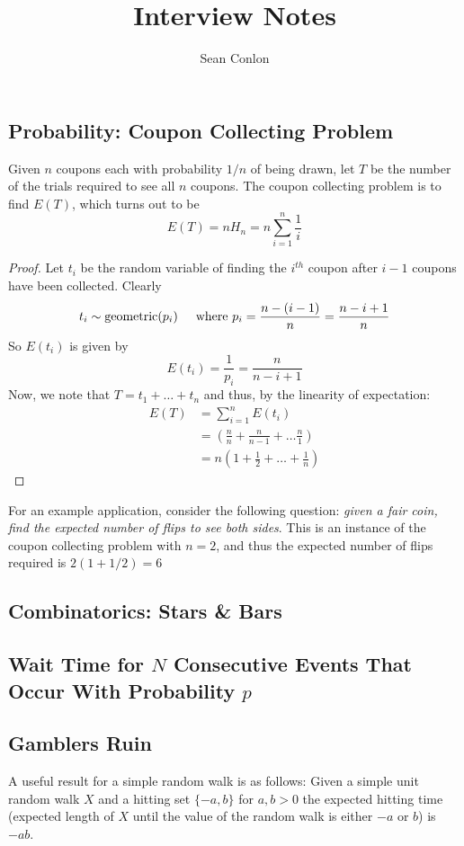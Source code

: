 \documentclass{article}
\title{Interview Notes}
\author{Sean Conlon}
\begin{document}
\maketitle

\newpage
\subsection*{Probability: Coupon Collecting Problem}
Given $n$ coupons each with probability $1/n$ of being drawn, let $T$ be the number of the trials required to see all $n$ coupons. The coupon collecting problem is to find $E(T)$, which turns out to be 
$$E(T) = n H_n = n \sum_{i=1}^{n}\frac{1}{i}$$
\begin{proof}
    Let $t_i$ be the random variable of finding the $i^{th}$ coupon after $i-1$ coupons have been collected. Clearly
    $$t_i \sim \text{geometric}(p_i) \hspace{5mm} \text{where } p_i = \frac{n-(i-1)}{n} = \frac{n-i+1}{n}$$
    So $E(t_i)$ is given by 
    $$E(t_i) = \frac{1}{p_i} = \frac{n}{n-i+1}$$
    Now, we note that $T = t_1 + \dots + t_n$ and thus, by the linearity of expectation: 
    \begin{align*}
        E(T) &= \sum_{i=1}^{n}E(t_i) \\
        &= \left(\frac{n}{n} + \frac{n}{n-1} + \dots \frac{n}{1} \right) \\
        &= n\left(1 + \frac{1}{2} + \dots + \frac{1}{n} \right)
    \end{align*}
\end{proof}
For an example application, consider the following question: \textit{given a fair coin, find the expected number of flips to see both sides}. This is an instance of the coupon collecting problem with $n=2$, and thus the expected number of flips required is $2(1+1/2) = 6$


\subsection*{Combinatorics: Stars \& Bars}


\newpage
\subsection*{Wait Time for $N$ Consecutive Events That Occur With Probability $p$}


\subsection*{Gamblers Ruin}
A useful result for a simple random walk is as follows: Given a simple unit random walk $X$ and a hitting set $\{-a, b\}$ for $a,b>0$ the expected hitting time (expected length of $X$ until the value of the random walk is either $-a$ or $b$) is $-ab$.
\end{document}
